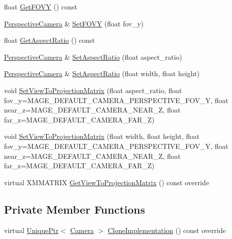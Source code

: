 \begin{DoxyCompactItemize}
\item 
float \hyperlink{classmage_1_1_perspective_camera_a15223034b30ca691c51de8850c033293}{Get\+F\+O\+VY} () const
\item 
\hyperlink{classmage_1_1_perspective_camera}{Perspective\+Camera} \& \hyperlink{classmage_1_1_perspective_camera_a2b6357e96bfbd5a322863cf6e72bb889}{Set\+F\+O\+VY} (float fov\+\_\+y)
\item 
float \hyperlink{classmage_1_1_perspective_camera_ab74cbd2777d5b430da5702a12b1b451e}{Get\+Aspect\+Ratio} () const
\item 
\hyperlink{classmage_1_1_perspective_camera}{Perspective\+Camera} \& \hyperlink{classmage_1_1_perspective_camera_afa5b9b8f6d1945fe63e9121359fb39bb}{Set\+Aspect\+Ratio} (float aspect\+\_\+ratio)
\item 
\hyperlink{classmage_1_1_perspective_camera}{Perspective\+Camera} \& \hyperlink{classmage_1_1_perspective_camera_a8fa66b4025306709cf825b267c866b29}{Set\+Aspect\+Ratio} (float width, float height)
\item 
void \hyperlink{classmage_1_1_perspective_camera_a7a7d25bbf0b5cf7952de9a3af280558b}{Set\+View\+To\+Projection\+Matrix} (float aspect\+\_\+ratio, float fov\+\_\+y=M\+A\+G\+E\+\_\+\+D\+E\+F\+A\+U\+L\+T\+\_\+\+C\+A\+M\+E\+R\+A\+\_\+\+P\+E\+R\+S\+P\+E\+C\+T\+I\+V\+E\+\_\+\+F\+O\+V\+\_\+Y, float near\+\_\+z=M\+A\+G\+E\+\_\+\+D\+E\+F\+A\+U\+L\+T\+\_\+\+C\+A\+M\+E\+R\+A\+\_\+\+N\+E\+A\+R\+\_\+Z, float far\+\_\+z=M\+A\+G\+E\+\_\+\+D\+E\+F\+A\+U\+L\+T\+\_\+\+C\+A\+M\+E\+R\+A\+\_\+\+F\+A\+R\+\_\+Z)
\item 
void \hyperlink{classmage_1_1_perspective_camera_a7e0688cce05ce5a0007fb000e8f1a43a}{Set\+View\+To\+Projection\+Matrix} (float width, float height, float fov\+\_\+y=M\+A\+G\+E\+\_\+\+D\+E\+F\+A\+U\+L\+T\+\_\+\+C\+A\+M\+E\+R\+A\+\_\+\+P\+E\+R\+S\+P\+E\+C\+T\+I\+V\+E\+\_\+\+F\+O\+V\+\_\+Y, float near\+\_\+z=M\+A\+G\+E\+\_\+\+D\+E\+F\+A\+U\+L\+T\+\_\+\+C\+A\+M\+E\+R\+A\+\_\+\+N\+E\+A\+R\+\_\+Z, float far\+\_\+z=M\+A\+G\+E\+\_\+\+D\+E\+F\+A\+U\+L\+T\+\_\+\+C\+A\+M\+E\+R\+A\+\_\+\+F\+A\+R\+\_\+Z)
\item 
virtual X\+M\+M\+A\+T\+R\+IX \hyperlink{classmage_1_1_perspective_camera_a83a38a4e8180707df2323130f9cee4a5}{Get\+View\+To\+Projection\+Matrix} () const override
\end{DoxyCompactItemize}
\subsection*{Private Member Functions}
\begin{DoxyCompactItemize}
\item 
virtual \hyperlink{namespacemage_a8c307fbcc33bce9b7f2aa4c26c3b95cf}{Unique\+Ptr}$<$ \hyperlink{classmage_1_1_camera}{Camera} $>$ \hyperlink{classmage_1_1_perspective_camera_aa597ab884256b7e6fad63653af3ac789}{Clone\+Implementation} () const override
\end{DoxyCompactItemize}
